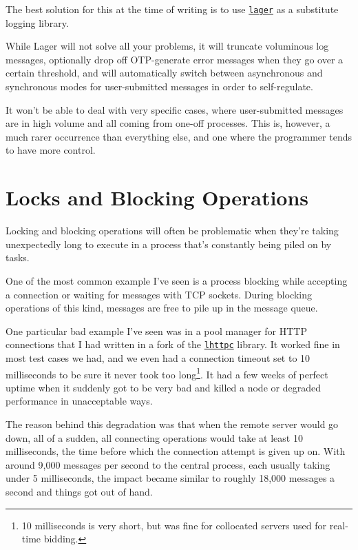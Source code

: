 \documentclass[11pt, oneside]{book}   	%
\newcommand{\module}[1]{\Verb`#1`}
\begin{document}
The best solution for this at the time of writing is to use \href{https://github.com/basho/lager}{\module{lager}} as a substitute logging library.

While Lager will not solve all your problems, it will truncate voluminous log messages, optionally drop off OTP-generate error messages when they go over a certain threshold, and will automatically switch between asynchronous and synchronous modes for user-submitted messages in order to self-regulate.

It won't be able to deal with very specific cases, where user-submitted messages are in high volume and all coming from one-off processes. This is, however, a much rarer occurrence than everything else, and one where the programmer tends to have more control.


\section{Locks and Blocking Operations}

Locking and blocking operations will often be problematic when they're taking unexpectedly long to execute in a process that's constantly being piled on by tasks.

One of the most common example I've seen is a process blocking while accepting a connection or waiting for messages with TCP sockets. During blocking operations of this kind, messages are free to pile up in the message queue.

One particular bad example I've seen was in a pool manager for HTTP connections that I had written in a fork of the \href{https://github.com/ferd/lhttpc}{\module{lhttpc}} library. It worked fine in most test cases we had, and we even had a connection timeout set to 10 milliseconds to be sure it never took too long\footnote{10 milliseconds is very short, but was fine for collocated servers used for real-time bidding.}. It had a few weeks of perfect uptime when it suddenly got to be very bad and killed a node or degraded performance in unacceptable ways.

The reason behind this degradation was that when the remote server would go down, all of a sudden, all connecting operations would take at least 10 milliseconds, the time before which the connection attempt is given up on. With around 9,000 messages per second to the central process, each usually taking under 5 milliseconds, the impact became similar to roughly 18,000 messages a second and things got out of hand.
\end{document}
